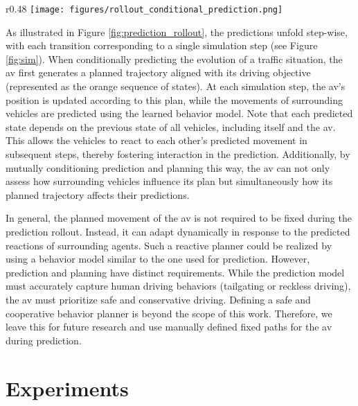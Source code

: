 \documentclass[a4paper,12pt,onecolumn]{article}
\begin{document}
\begin{wrapfigure}{r}{0.48\textwidth} %
\centering
\texttt{[image: figures/rollout\_conditional\_prediction.png]}
\vspace{-25pt} %
\caption{Conditional prediction rollout with past states (blue), \gls{av}'s plan (orange), and predicted states (white).} 
\label{fig:prediction_rollout}
\vspace{-8pt} %
\end{wrapfigure}

As illustrated in Figure \ref{fig:prediction_rollout}, the predictions unfold step-wise, with each transition corresponding to a single simulation step (see Figure \ref{fig:sim}). When conditionally predicting the evolution of a traffic situation, the \gls{av} first generates a planned trajectory aligned with its driving objective (represented as the orange sequence of states). At each simulation step, the \gls{av}'s position is updated according to this plan, while the movements of surrounding vehicles are predicted using the learned behavior model. Note that each predicted state depends on the previous state of all vehicles, including itself and the \gls{av}. This allows the vehicles to react to each other's predicted movement in subsequent steps, thereby fostering interaction in the prediction. Additionally, by mutually conditioning prediction and planning this way, the \gls{av} can not only assess how surrounding vehicles influence its plan but simultaneously how its planned trajectory affects their predictions. 

In general, the planned movement of the \gls{av} is not required to be fixed during the prediction rollout. Instead, it can adapt dynamically in response to the predicted reactions of surrounding agents. Such a reactive planner could be realized by using a behavior model similar to the one used for prediction. However, prediction and planning have distinct requirements. While the prediction model must accurately capture human driving behaviors (\eg tailgating or reckless driving), the \gls{av} must prioritize safe and conservative driving. Defining a safe and cooperative behavior planner is beyond the scope of this work. Therefore, we leave this for future research and use manually defined fixed paths for the \gls{av} during prediction.


\section{Experiments}
\end{document}
